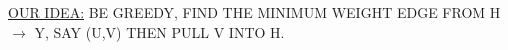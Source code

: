 \documentclass[preview]{standalone}
\begin{document}
\begin{center}
\underline{OUR IDEA:} BE GREEDY, FIND THE MINIMUM WEIGHT EDGE FROM H $ \rightarrow $ Y, SAY (U,V) THEN PULL V INTO H.
\end{center}
\end{document}
